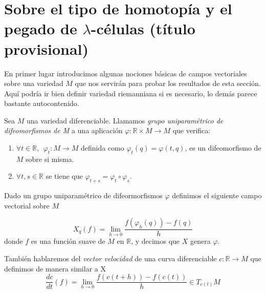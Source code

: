 

\section{Sobre el tipo de homotopía y el pegado de $\lambda$-células \color{blue}(título provisional)}

En primer lugar introducimos algunas nociones básicas de campos vectoriales sobre una variedad $M$ que nos servirán para probar los resultados de esta sección.
{\color{blue} Aquí podría ir bien definir variedad riemanniana si es necesario, lo demás parece bastante autocontenido.}

\bigskip
\begin{definition}
    Sea $M$ una variedad diferenciable. Llamamos \textit{grupo uniparamétrico de difeomorfismos de M} a una aplicación $\varphi:\mathbb{R}\times M \to M$ que verifica:
    \begin{enumerate}[label=\roman*)]
        \item $\forall t\in \mathbb{R},~~ \varphi_t:M\to M$ definida como $\varphi_t(q)=\varphi(t,q)$, es un difeomorfismo de $M$ sobre si misma.

        \item $\forall t, s\in\mathbb{R}$ se tiene que $\varphi_{t+s}=\varphi_t\circ \varphi_s$.
    \end{enumerate}
\end{definition}
\bigskip

Dado un grupo uniparamétrico de difeormorfismos $\varphi$ definimos el siguiente campo vectorial sobre $M$

\begin{equation*}
    X_q(f)=\lim_{h\to 0}\frac{f(\varphi_h(q))-f(q)}{h}
\end{equation*}
donde $f$ es una función suave de $M$ en $\mathbb{R}$, y decimos que $X$ genera $\varphi$.

También hablaremos del \textit{vector velocidad} de una curva diferenciable $c:\mathbb{R}\to M$ que definimos de manera similar a X
\begin{equation*}
    \frac{dc}{dt}(f)= \lim_{h\to 0}\frac{f(c(t+h))-f(c(t))}{h}\in T_{c(t)}M 
\end{equation*} 

